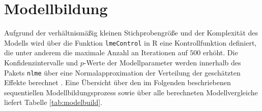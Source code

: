	\section{Modellbildung}		\label{modelbuild}
		Aufgrund der verhältnismäßig kleinen Stichprobengröße und der Komplexität des Modells wird über die Funktion \texttt{lmeControl} \parencite[nach][]{GRIMM2017} in R eine Kontrollfunktion definiert, die unter anderem die maximale Anzahl an Iterationen auf $500$ erhöht.
		Die Konfidenzintervalle und $p$-Werte der Modellparameter werden innerhalb des Pakets \texttt{nlme} über eine Normalapproximation der Verteilung der geschätzten Effekte berechnet \parencite[für die mathematische Herleitung siehe][]{PINHEIRO2000}.
		Eine Übersicht über den im Folgenden beschriebenen sequentiellen Modellbildungsprozess sowie über alle berechneten Modellvergleiche liefert Tabelle \ref{tab:modelbuild}. 
		
